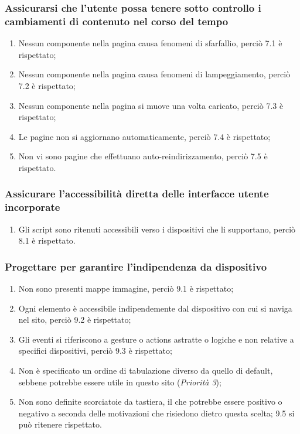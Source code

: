 \subsubsection{Assicurarsi che l'utente possa tenere sotto controllo i
cambiamenti di contenuto nel corso del tempo}
\begin{enumerate}
\item Nessun componente nella pagina causa fenomeni di sfarfallio, perciò 7.1
è rispettato;
\item Nessun componente nella pagina causa fenomeni di lampeggiamento, perciò
7.2 è rispettato;
\item Nessun componente nella pagina si muove una volta caricato, perciò 7.3 è
rispettato;
\item Le pagine non si aggiornano automaticamente, perciò 7.4 è rispettato;
\item Non vi sono pagine che effettuano auto-reindirizzamento, perciò 7.5 è
rispettato.
\end{enumerate}

\subsubsection{Assicurare l'accessibilità diretta delle interfacce utente
incorporate}
\begin{enumerate}
\item Gli script sono ritenuti accessibili verso i dispositivi che li
supportano, perciò 8.1 è rispettato.
\end{enumerate}

\subsubsection{Progettare per garantire l'indipendenza da dispositivo}
\begin{enumerate}
\item Non sono presenti mappe immagine, perciò 9.1 è rispettato;
\item Ogni elemento è accessibile indipendemente dal dispositivo con cui si
naviga nel sito, perciò 9.2 è rispettato;
\item Gli eventi si riferiscono a gesture o actions astratte o logiche e non
relative a specifici dispositivi, perciò 9.3 è rispettato;
\item Non è specificato un ordine di tabulazione diverso da quello di default,
sebbene potrebbe essere utile in questo sito (\textit{Priorità 3});
\item Non sono definite scorciatoie da tastiera, il che potrebbe essere
positivo o negativo a seconda delle motivazioni che risiedono dietro questa
scelta; 9.5 si può ritenere rispettato.
\end{enumerate}

